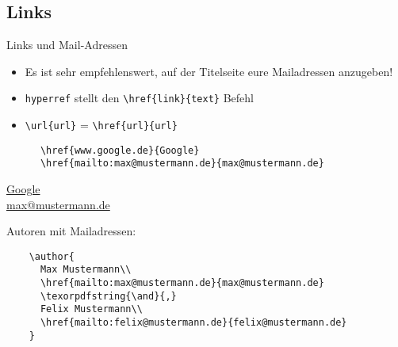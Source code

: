 \subsection{Links}
\begin{frame}[fragile]{Links und Mail-Adressen}
  \begin{itemize}
    \item Es ist sehr empfehlenswert, auf der Titelseite eure Mailadressen anzugeben!
    \item \texttt{hyperref} stellt den \lstinline+\href{link}{text}+ Befehl
    \item \lstinline+\url{url}+ = \lstinline+\href{url}{url}+
  \end{itemize}
  \begin{CodeExample}{0.5}
    \begin{lstlisting}
      \href{www.google.de}{Google}
      \href{mailto:max@mustermann.de}{max@mustermann.de}
    \end{lstlisting}
    \CodeResult
    \href{www.google.de}{Google}\\
    \href{mailto:max@mustermann.de}{max@mustermann.de}
  \end{CodeExample}
  \begin{block}{Autoren mit Mailadressen:}
    \begin{lstlisting}
    \author{
      Max Mustermann\\
      \href{mailto:max@mustermann.de}{max@mustermann.de}
      \texorpdfstring{\and}{,}
      Felix Mustermann\\
      \href{mailto:felix@mustermann.de}{felix@mustermann.de}
    }
    \end{lstlisting}
  \end{block}
\end{frame}
